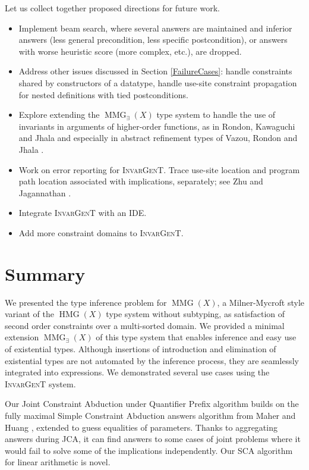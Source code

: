 \documentclass{article}
\newcommand{\tmname}[1]{\textsc{#1}}
\newcommand{\tmop}[1]{\ensuremath{\operatorname{#1}}}
\begin{document}
Let us collect together proposed directions for future work.
\begin{itemize}
  \item Implement beam search, where several answers are maintained and
  inferior answers (less general precondition, less specific postcondition),
  or answers with worse heuristic score (more complex, etc.), are dropped.
  
  \item Address other issues discussed in Section \ref{FailureCases}: handle
  constraints shared by constructors of a datatype, handle use-site constraint
  propagation for nested definitions with tied postconditions.
  
  \item Explore extending the $\tmop{MMG}_{\exists} (X)$ type system to handle
  the use of invariants in arguments of higher-order functions, as in Rondon,
  Kawaguchi and Jhala {\cite{DSolvePaper}} and especially in abstract
  refinement types of Vazou, Rondon and Jhala {\cite{AbstractLiquid}}.
  
  \item Work on error reporting for {\tmname{InvarGenT}}. Trace use-site
  location and program path location associated with implications, separately;
  see Zhu and Jagannathan {\cite{LightDML}}.
  
  \item Integrate {\tmname{InvarGenT}} with an IDE.
  
  \item Add more constraint domains to {\tmname{InvarGenT}}.
\end{itemize}

\section{Summary}

We presented the type inference problem for $\tmop{MMG} (X)$, a Milner-Mycroft
style variant of the $\tmop{HMG} (X)$ type system without subtyping, as
satisfaction of second order constraints over a multi-sorted domain. We
provided a minimal extension $\tmop{MMG}_{\exists} (X)$ of this type system
that enables inference and easy use of existential types. Although insertions
of introduction and elimination of existential types are not automated by the
inference process, they are seamlessly integrated into expressions. We
demonstrated several use cases using the {\tmname{{\tmname{InvarGenT}}}}
system.

Our Joint Constraint Abduction under Quantifier Prefix algorithm builds on
the fully maximal Simple Constraint Abduction answers algorithm from Maher and
Huang {\cite{AbductionSolvMaher}}, extended to guess equalities of parameters.
Thanks to aggregating answers during JCA, it can find answers to some cases of
joint problems where it would fail to solve some of the implications
independently. Our SCA algorithm for linear arithmetic is novel.
\end{document}
